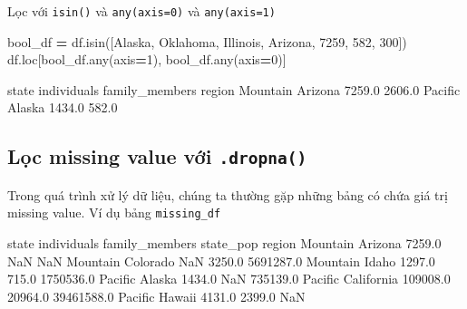 \documentclass[
]{book}
\newenvironment{Shaded}{\begin{snugshade}}{\end{snugshade}}
\newcommand{\BuiltInTok}[1]{#1}
\newcommand{\DecValTok}[1]{\textcolor[rgb]{0.00,0.00,0.81}{#1}}
\newcommand{\FloatTok}[1]{\textcolor[rgb]{0.00,0.00,0.81}{#1}}
\newcommand{\NormalTok}[1]{#1}
\newcommand{\OperatorTok}[1]{\textcolor[rgb]{0.81,0.36,0.00}{\textbf{#1}}}
\newcommand{\StringTok}[1]{\textcolor[rgb]{0.31,0.60,0.02}{#1}}
\begin{document}
Lọc với \texttt{isin()} và \texttt{any(axis=0)} và \texttt{any(axis=1)}

\begin{Shaded}
\begin{Highlighting}[]
\NormalTok{bool\_df }\OperatorTok{=}\NormalTok{ df.isin([}\StringTok{\textquotesingle{}Alaska\textquotesingle{}}\NormalTok{, }\StringTok{\textquotesingle{}Oklahoma\textquotesingle{}}\NormalTok{, }\StringTok{\textquotesingle{}Illinois\textquotesingle{}}\NormalTok{, }\StringTok{\textquotesingle{}Arizona\textquotesingle{}}\NormalTok{, }\DecValTok{7259}\NormalTok{, }\DecValTok{582}\NormalTok{, }\DecValTok{300}\NormalTok{])}
\NormalTok{df.loc[bool\_df.}\BuiltInTok{any}\NormalTok{(axis}\OperatorTok{=}\DecValTok{1}\NormalTok{), bool\_df.}\BuiltInTok{any}\NormalTok{(axis}\OperatorTok{=}\DecValTok{0}\NormalTok{)]}
\end{Highlighting}
\end{Shaded}

\begin{Shaded}
\begin{Highlighting}[]
\NormalTok{            state  individuals  family\_members}
\NormalTok{region                                        }
\NormalTok{Mountain  Arizona       7259.0          2606.0}
\NormalTok{Pacific    Alaska       1434.0           582.0}
\end{Highlighting}
\end{Shaded}

\subsection{\texorpdfstring{Lọc missing value với \texttt{.dropna()}}{Lọc missing value với .dropna()}}\label{lux1ecdc-missing-value-vux1edbi-.dropna}

Trong quá trình xử lý dữ liệu, chúng ta thường gặp những bảng có chứa giá trị missing value. Ví dụ bảng \texttt{missing\_df}

\begin{Shaded}
\begin{Highlighting}[]
\NormalTok{               state  individuals  family\_members   state\_pop}
\NormalTok{region                                                       }
\NormalTok{Mountain     Arizona       }\FloatTok{7259.0}\NormalTok{             NaN         NaN}
\NormalTok{Mountain    Colorado          NaN          }\FloatTok{3250.0}   \FloatTok{5691287.0}
\NormalTok{Mountain       Idaho       }\FloatTok{1297.0}           \FloatTok{715.0}   \FloatTok{1750536.0}
\NormalTok{Pacific       Alaska       }\FloatTok{1434.0}\NormalTok{             NaN    }\FloatTok{735139.0}
\NormalTok{Pacific   California     }\FloatTok{109008.0}         \FloatTok{20964.0}  \FloatTok{39461588.0}
\NormalTok{Pacific       Hawaii       }\FloatTok{4131.0}          \FloatTok{2399.0}\NormalTok{         NaN}
\end{Highlighting}
\end{Shaded}
\end{document}

